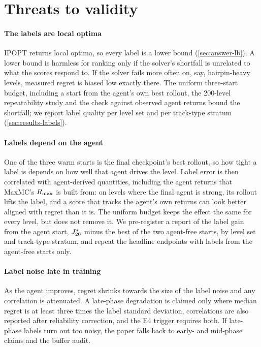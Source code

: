\section{Threats to validity}
\label{sec:threats}

\paragraph{The labels are local optima} IPOPT returns local optima, so every label is a
lower bound (\cref{sec:answer-lb}). A lower bound is harmless for ranking only if the
solver's shortfall is unrelated to what the scores respond to. If the solver fails more
often on, say, hairpin-heavy levels, measured regret is biased low exactly there. The
uniform three-start budget, including a start from the agent's own best rollout, the
200-level repeatability study and the check against observed agent returns bound the
shortfall; we report label quality per level set and per track-type stratum
(\cref{sec:results-labels}).

\paragraph{Labels depend on the agent} One of the three warm starts is the final
checkpoint's best rollout, so how tight a label is depends on how well that agent drives
the level. Label error is then correlated with agent-derived quantities, including the
agent returns that MaxMC's $R_{\max}$ is built from: on levels where the final agent is
strong, its rollout lifts the label, and a score that tracks the agent's own returns can
look better aligned with regret than it is. The uniform budget keeps the effect the same
for every level, but does not remove it. We pre-register a report of the label gain from
the agent start, $J^{*}_{20}$ minus the best of the two agent-free starts, by level set and
track-type stratum, and repeat the headline endpoints with labels from the agent-free
starts only.

\paragraph{Label noise late in training} As the agent improves, regret shrinks towards
the size of the label noise and any correlation is attenuated. A late-phase degradation
is claimed only where median regret is at least three times the label standard deviation,
correlations are also reported after reliability correction, and the E4 trigger requires
both. If late-phase labels turn out too noisy, the paper falls back to early- and
mid-phase claims and the buffer audit.

